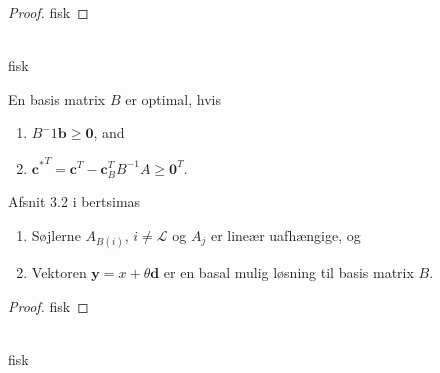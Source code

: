 %
\begin{proof}
fisk
\end{proof}
\\
%
fisk
%
%
\begin{defn}{}{}
En basis matrix $B$ er optimal, hvis
\begin{enumerate}[label = (\alph*)]
\item $B^-1 \mathbf{b} \geq \mathbf{0}$, and
\item ${\mathbf{c}^*}^T = \mathbf{c}^T - \mathbf{c}_B^T B^{-1} A \geq \mathbf{0}^T$.
\end{enumerate}
\end{defn}
\noindent
%
%
% 
Afsnit 3.2 i bertsimas
\begin{thm}{}{}
\begin{enumerate}[label = (\alph*)]
\item Søjlerne $A_{B(i)}$, $i \neq \mathcal{L}$ og $A_j$ er lineær uafhængige, og 
\item Vektoren $\mathbf{y}=x+ \theta \mathbf{d}$ er en basal mulig løsning til basis matrix $B$.
\end{enumerate}
\end{thm}
%
\begin{proof}
fisk
\end{proof}
\\
%
fisk